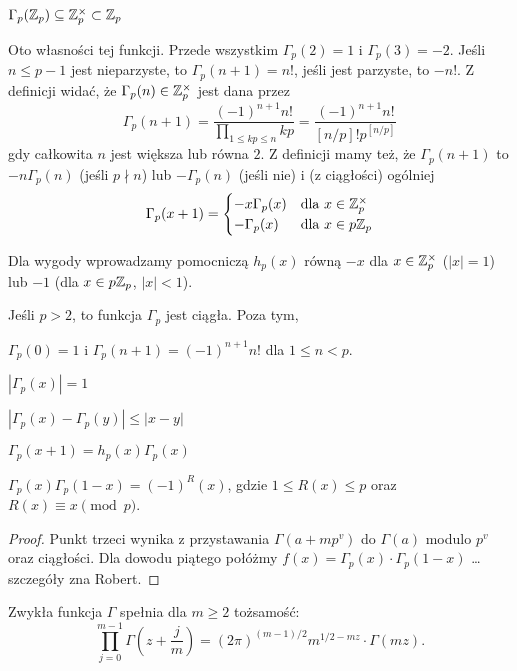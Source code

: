 \begin{lemat}
	$\Gamma_p(\mathbb Z_p) \subseteq \mathbb Z_p^\times \subset \mathbb Z_p$
\end{lemat}

Oto  własności tej funkcji.
Przede wszystkim $\Gamma_p(2) =1$ i $\Gamma_p(3) = -2$.
Jeśli $n \le p-1$ jest nieparzyste, to $\Gamma_p(n+1) = n!$, jeśli jest parzyste, to $-n!$.
Z definicji widać, że $\Gamma_p(n) \in \mathbb Z_p^\times$ jest dana przez
\[
	\Gamma_p(n+1) = \frac{(-1)^{n+1}n!}{\prod_{1 \le kp \le n} kp} = \frac{(-1)^{n+1}n!}{[n/p]! p^{[n/p]}}
\]
gdy całkowita $n$ jest większa lub równa $2$.
Z definicji mamy też, że $\Gamma_p(n+1)$ to $-n \Gamma_p(n)$ (jeśli $p \nmid n$) lub $-\Gamma_p(n)$ (jeśli nie) i (z ciągłości) ogólniej
\[
	\Gamma_p(x+1) = \begin{cases}
		-x \Gamma_p(x) & \text{dla } x \in \mathbb Z_p^\times \\
		-\Gamma_p(x) & \text{dla } x \in p\mathbb Z_p
	\end{cases}
\]

Dla wygody wprowadzamy pomocniczą $h_p(x)$ równą $-x$ dla $x \in \mathbb Z_p^\times$ ($|x|=1$) lub $-1$ (dla $x \in p\mathbb Z_p$, $|x|<1$).

\begin{fakt}
	\label{impuls}
	Jeśli $p > 2$, to funkcja $\Gamma_p$ jest ciągła.
	Poza tym,
	\begin{enumx}
		\item $\Gamma_p(0) = 1$ i $\Gamma_p(n+1) = (-1)^{n+1}n!$ dla $1 \le n < p$.
		\item $|\Gamma_p(x)| = 1$
		\item $|\Gamma_p(x) - \Gamma_p(y)| \le |x-y|$
		\item $\Gamma_p(x+1) = h_p(x) \Gamma_p(x)$
		\item $\Gamma_p(x) \Gamma_p(1-x) = (-1)^R(x)$, gdzie $1 \le R(x) \le p$ oraz $R(x) \equiv x \pmod p$.
	\end{enumx}
\end{fakt}

\begin{proof}
Punkt trzeci wynika z przystawania $\Gamma(a + mp^v)$ do $\Gamma(a)$ modulo $p^v$ oraz ciągłości.
Dla dowodu piątego połóżmy $f(x) = \Gamma_p(x) \cdot \Gamma_p(1-x)$ \dots szczegóły zna Robert.
\end{proof}

Zwykła  funkcja $\Gamma$ spełnia dla $m\ge 2$ tożsamość:
\[
	\prod_{j=0}^{m-1} \Gamma \left(z + \frac jm\right) = (2\pi)^{(m-1)/2} m^{1/2-mz} \cdot \Gamma (mz).
\]

